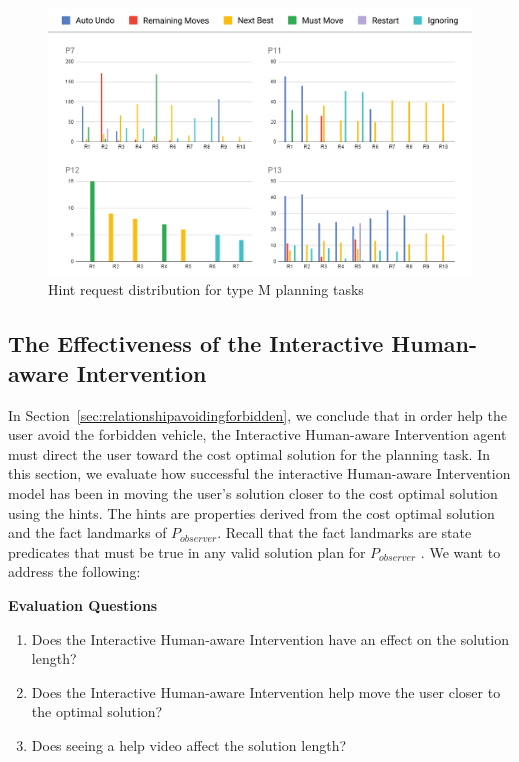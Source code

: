 \begin{figure}[tpb]
  \centering
\includegraphics[width=\columnwidth]{img/requesttypem.png}
  \caption{Hint request distribution for type M planning tasks}
  \label{fig:requesttypem}
\end{figure}

\subsection{The Effectiveness of the Interactive Human-aware Intervention}
In Section~\ref{sec:relationshipavoidingforbidden}, we conclude that in order help the user avoid the forbidden vehicle, the Interactive Human-aware Intervention agent must direct the user toward the cost optimal solution for the planning task.
In this section, we evaluate how successful the interactive Human-aware Intervention model has been in moving the user's solution closer to the cost optimal solution using the hints.
The hints are properties derived from the cost optimal solution and the fact landmarks of $P_{observer}$.
Recall that the fact landmarks are state predicates that must be true in any valid solution plan for $P_{observer}$ \cite{hoffman2004lm}.
We want to address the following:

\textbf{Evaluation Questions}
\begin{enumerate}
\item Does the Interactive Human-aware Intervention have an effect on the solution length?
\item Does the Interactive Human-aware Intervention help move the user closer to the optimal solution?
\item Does seeing a help video affect the solution length?
\end{enumerate}

